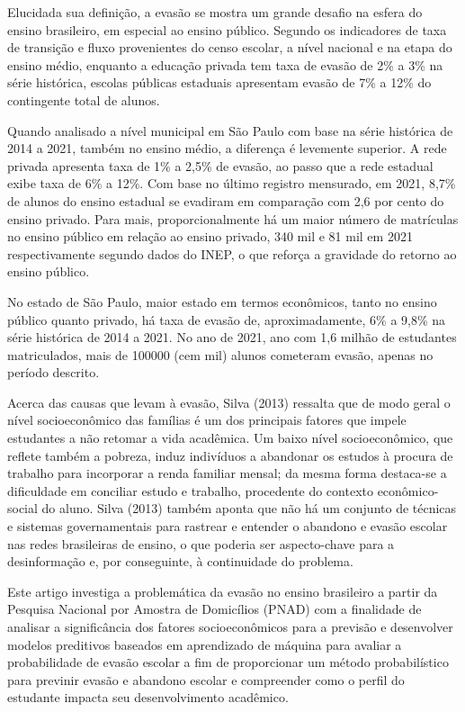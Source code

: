 \documentclass[english, spanish, brazilian]{RBIEarticle} %
\begin{document}
Elucidada sua definição, a evasão se mostra um grande desafio na esfera do ensino brasileiro, em especial ao ensino público. Segundo os indicadores de taxa de transição e fluxo provenientes do censo escolar, a nível nacional e na etapa do ensino médio, enquanto a educação privada tem taxa de evasão de 2\% a 3\% na série histórica, escolas públicas estaduais apresentam evasão de 7\% a 12\% do contingente total de alunos. 

Quando analisado a nível municipal em São Paulo com base na série histórica de 2014 a 2021, também no ensino médio, a diferença é levemente superior. A rede privada apresenta taxa de 1\% a 2,5\% de evasão, ao passo que a rede estadual exibe taxa de 6\% a 12\%. Com base no último registro mensurado, em 2021, 8,7\% de alunos do ensino estadual se evadiram em comparação com 2,6 por cento do ensino privado. Para mais, proporcionalmente há um maior número de matrículas no ensino público em relação ao ensino privado, 340 mil e 81 mil em 2021 respectivamente segundo dados do INEP, o que reforça a gravidade do retorno ao ensino público. 

No estado de São Paulo, maior estado em termos econômicos, tanto no ensino público quanto privado, há taxa de evasão de, aproximadamente, 6\% a 9,8\% na série histórica de 2014 a 2021. No ano de 2021, ano com 1,6 milhão de estudantes matriculados, mais de 100000 (cem mil) alunos cometeram evasão, apenas no período descrito. 

Acerca das causas que levam à evasão, Silva (2013) ressalta que de modo geral o nível socioeconômico das famílias é um dos principais fatores que impele estudantes a não retomar a vida acadêmica. Um baixo nível socioeconômico, que reflete também a pobreza, induz indivíduos a abandonar os estudos à procura de trabalho para incorporar a renda familiar mensal; da mesma forma destaca-se a dificuldade em conciliar estudo e trabalho, procedente do contexto econômico-social do aluno. Silva (2013) também aponta que não há um conjunto de técnicas e sistemas governamentais para rastrear e entender o abandono e evasão escolar nas redes brasileiras de ensino, o que poderia ser aspecto-chave para a desinformação e, por conseguinte, à continuidade do problema.

Este artigo investiga a problemática da evasão no ensino brasileiro a partir da Pesquisa Nacional por Amostra de Domicílios (PNAD) com a finalidade de analisar a significância dos fatores socioeconômicos para a previsão e desenvolver modelos preditivos baseados em aprendizado de máquina para avaliar a probabilidade de evasão escolar a fim de proporcionar um método probabilístico para previnir evasão e abandono escolar e compreender como o perfil do estudante impacta seu desenvolvimento acadêmico. 
\end{document}
